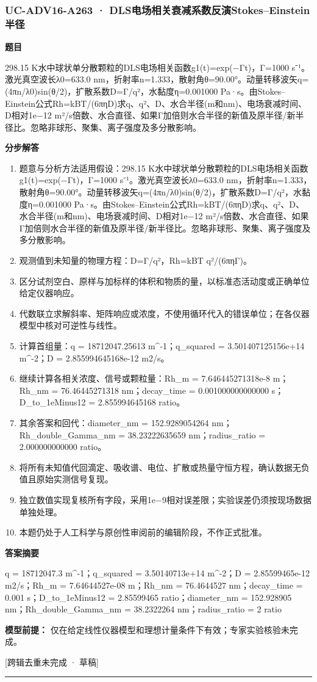 \documentclass[UTF8,11pt,a4paper]{ctexart}
\begin{document}
\subsubsection*{UC-ADV16-A263 · DLS电场相关衰减系数反演Stokes–Einstein半径}
\noindent\textbf{题目}\par
298.15 K水中球状单分散颗粒的DLS电场相关函数g1(t)=exp(−Γt)，Γ=1000 s⁻¹。激光真空波长λ0=633.0 nm，折射率n=1.333，散射角θ=90.00°。动量转移波矢q=(4πn/λ0)sin(θ/2)，扩散系数D=Γ/q²，水黏度η=0.001000 Pa·s。由Stokes–Einstein公式Rh=kBT/(6πηD)求q、q²、D、水合半径(m和nm)、电场衰减时间、D相对1e−12 m²/s倍数、水合直径、如果Γ加倍则水合半径的新值及原半径/新半径比。忽略非球形、聚集、离子强度及多分散影响。\par
\medskip\noindent\textbf{分步解答}
\begin{enumerate}
\item 题意与分析方法适用假设：298.15 K水中球状单分散颗粒的DLS电场相关函数g1(t)=exp(−Γt)，Γ=1000 s⁻¹。激光真空波长λ0=633.0 nm，折射率n=1.333，散射角θ=90.00°。动量转移波矢q=(4πn/λ0)sin(θ/2)，扩散系数D=Γ/q²，水黏度η=0.001000 Pa·s。由Stokes–Einstein公式Rh=kBT/(6πηD)求q、q²、D、水合半径(m和nm)、电场衰减时间、D相对1e−12 m²/s倍数、水合直径、如果Γ加倍则水合半径的新值及原半径/新半径比。忽略非球形、聚集、离子强度及多分散影响。
\item 观测值到未知量的物理方程：D=Γ/q²，Rh=kBT q²/(6πηΓ)。
\item 区分试剂空白、原样与加标样的体积和物质的量，以标准态活动度或正确单位给定仪器响应。
\item 代数联立求解斜率、矩阵响应或浓度，不使用循环代入的错误单位；在各仪器模型中核对可逆性与线性。
\item 计算首组量：q = 18712047.25613 m\textasciicircum{}-1；q\_squared = 3.501407125156e+14 m\textasciicircum{}-2；D = 2.855994645168e-12 m2/s。
\item 继续计算各相关浓度、信号或颗粒量：Rh\_m = 7.646445271318e-8 m；Rh\_nm = 76.46445271318 nm；decay\_time = 0.001000000000000 s；D\_to\_1eMinus12 = 2.855994645168 ratio。
\item 其余答案和回代：diameter\_nm = 152.9289054264 nm；Rh\_double\_Gamma\_nm = 38.23222635659 nm；radius\_ratio = 2.000000000000 ratio。
\item 将所有未知值代回滴定、吸收谱、电位、扩散或热量守恒方程，确认数据无负值且原始实测信号复现。
\item 独立数值实现复核所有字段，采用1e−9相对误差限；实验误差仍须按现场数据单独处理。
\item 本题仍处于人工科学与原创性审阅前的编辑阶段，不作正式批准。
\end{enumerate}
\noindent\textbf{答案摘要}\par
q = 18712047.3 m\textasciicircum{}-1；q\_squared = 3.50140713e+14 m\textasciicircum{}-2；D = 2.85599465e-12 m2/s；Rh\_m = 7.64644527e-08 m；Rh\_nm = 76.4644527 nm；decay\_time = 0.001 s；D\_to\_1eMinus12 = 2.85599465 ratio；diameter\_nm = 152.928905 nm；Rh\_double\_Gamma\_nm = 38.2322264 nm；radius\_ratio = 2 ratio\par
\noindent\textbf{模型前提：}
仅在给定线性仪器模型和理想计量条件下有效；专家实验核验未完成。\par
\noindent\textcolor{red!65!black}{[跨辑去重未完成 · 草稿]} \par
\medskip\hrule\medskip
{}
\end{document}

